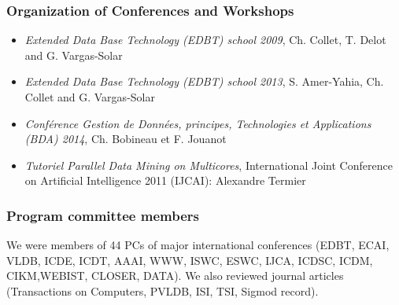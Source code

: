 \subsubsection*{Organization of Conferences and Workshops}

\begin{itemize}
\setlength{\itemindent}{-0.5cm}
\setlength{\itemsep}{-0.1cm}

\item \emph{Extended Data Base Technology (EDBT) school 2009}, Ch. Collet, T. Delot and G. Vargas-Solar

\item \emph{Extended Data Base Technology (EDBT) school 2013}, S.  Amer-Yahia, Ch. Collet and G. Vargas-Solar

\item \emph{Conf{\'e}rence Gestion de Donn{\'e}es, principes, Technologies et Applications (BDA) 2014}, Ch. Bobineau et F. Jouanot
 
 \item \emph{Tutoriel Parallel Data Mining on Multicores}, International Joint Conference on Artificial Intelligence  2011 (IJCAI): Alexandre Termier

\end{itemize}

\subsubsection*{Program committee members}

We were members of 44 PCs of major international conferences (EDBT, ECAI, VLDB, ICDE, ICDT, AAAI, WWW, ISWC, ESWC, IJCA, ICDSC, ICDM, CIKM,WEBIST, CLOSER, DATA).   
We also reviewed journal articles (Transactions on Computers, PVLDB, ISI, TSI, Sigmod record).



